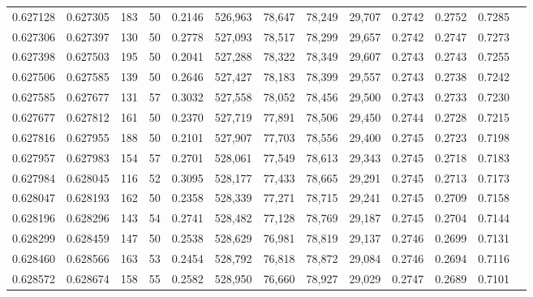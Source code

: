 \begin{tabular}{rrrrrrrrrrrrr}
0.627128 & 0.627305 &   183 &  50 &                                     0.2146 & 526,963 &  78,647 &  78,249 &  29,707 & 0.2742 & 0.2752 & 0.7285 \\
0.627306 & 0.627397 &   130 &  50 &                                     0.2778 & 527,093 &  78,517 &  78,299 &  29,657 & 0.2742 & 0.2747 & 0.7273 \\
0.627398 & 0.627503 &   195 &  50 &                                     0.2041 & 527,288 &  78,322 &  78,349 &  29,607 & 0.2743 & 0.2743 & 0.7255 \\
0.627506 & 0.627585 &   139 &  50 &                                     0.2646 & 527,427 &  78,183 &  78,399 &  29,557 & 0.2743 & 0.2738 & 0.7242 \\
0.627585 & 0.627677 &   131 &  57 &                                     0.3032 & 527,558 &  78,052 &  78,456 &  29,500 & 0.2743 & 0.2733 & 0.7230 \\
0.627677 & 0.627812 &   161 &  50 &                                     0.2370 & 527,719 &  77,891 &  78,506 &  29,450 & 0.2744 & 0.2728 & 0.7215 \\
0.627816 & 0.627955 &   188 &  50 &                                     0.2101 & 527,907 &  77,703 &  78,556 &  29,400 & 0.2745 & 0.2723 & 0.7198 \\
0.627957 & 0.627983 &   154 &  57 &                                     0.2701 & 528,061 &  77,549 &  78,613 &  29,343 & 0.2745 & 0.2718 & 0.7183 \\
0.627984 & 0.628045 &   116 &  52 &                                     0.3095 & 528,177 &  77,433 &  78,665 &  29,291 & 0.2745 & 0.2713 & 0.7173 \\
0.628047 & 0.628193 &   162 &  50 &                                     0.2358 & 528,339 &  77,271 &  78,715 &  29,241 & 0.2745 & 0.2709 & 0.7158 \\
0.628196 & 0.628296 &   143 &  54 &                                     0.2741 & 528,482 &  77,128 &  78,769 &  29,187 & 0.2745 & 0.2704 & 0.7144 \\
0.628299 & 0.628459 &   147 &  50 &                                     0.2538 & 528,629 &  76,981 &  78,819 &  29,137 & 0.2746 & 0.2699 & 0.7131 \\
0.628460 & 0.628566 &   163 &  53 &                                     0.2454 & 528,792 &  76,818 &  78,872 &  29,084 & 0.2746 & 0.2694 & 0.7116 \\
0.628572 & 0.628674 &   158 &  55 &                                     0.2582 & 528,950 &  76,660 &  78,927 &  29,029 & 0.2747 & 0.2689 & 0.7101 \\

\end{tabular}
